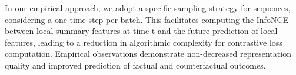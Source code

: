 \documentclass{article}
\theoremstyle{plain}
\theoremstyle{definition}
\theoremstyle{remark}
\begin{document}
In our empirical approach, we adopt a specific sampling strategy for sequences, considering a one-time step per batch. This facilitates computing the InfoNCE between local summary features at time t and the future prediction of local features, leading to a reduction in algorithmic complexity for contrastive loss computation. Empirical observations demonstrate non-decreased representation quality and improved prediction of factual and counterfactual outcomes.






\end{document}
